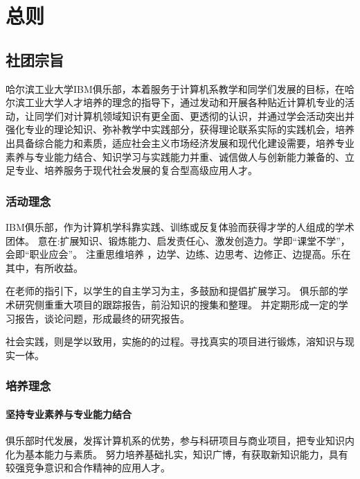 \documentclass{club}
\begin{document}
\maketitle
\tableofcontents
\newpage

\section{总则}

\subsection{社团宗旨}

哈尔滨工业大学IBM俱乐部，本着服务于计算机系教学和同学们发展的目标，在哈尔滨工业大学人才培养的理念的指导下，通过发动和开展各种贴近计算机专业的活动，让同学们对计算机领域知识有更全面、更透彻的认识，并通过学会活动突出并强化专业的理论知识、弥补教学中实践部分，获得理论联系实际的实践机会，培养出具备综合能力和素质，适应社会主义市场经济发展和现代化建设需要，培养专业素养与专业能力结合、知识学习与实践能力并重、诚信做人与创新能力兼备的、立足专业、培养服务于现代社会发展的复合型高级应用人才。

\subsubsection{活动理念}

IBM俱乐部，作为计算机学科靠实践、训练或反复体验而获得才学的人组成的学术团体。
意在:扩展知识、锻炼能力、启发责任心、激发创造力。学即“课堂不学”，会即“职业应会”。
注重思维培养 ，边学、边练、边思考、边修正、边提高。乐在其中，有所收益。

在老师的指引下，以学生的自主学习为主，多鼓励和提倡扩展学习。
俱乐部的学术研究侧重重大项目的跟踪报告，前沿知识的搜集和整理。
并定期形成一定的学习报告，谈论问题，形成最终的研究报告。

社会实践，则是学以致用，实施的的过程。寻找真实的项目进行锻炼，溶知识与现实一体。

\subsubsection{培养理念}

\paragraph{坚持专业素养与专业能力结合}俱乐部时代发展，发挥计算机系的优势，参与科研项目与商业项目，把专业知识内化为基本能力与素质。
努力培养基础扎实，知识广博，有获取新知识能力，具有较强竞争意识和合作精神的应用人才。
\end{document}
